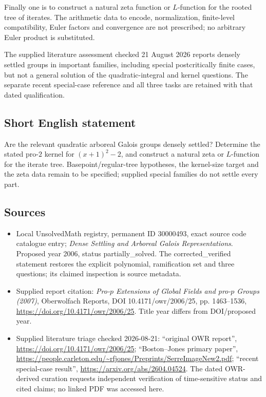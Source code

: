 \documentclass[11pt]{article}
\begin{document}
Finally one is to construct a natural zeta function or $L$-function for the rooted tree of iterates. The arithmetic data to encode, normalization, finite-level compatibility, Euler factors and convergence are not prescribed; no arbitrary Euler product is substituted.

The supplied literature assessment checked 21 August 2026 reports densely settled groups in important families, including special postcritically finite cases, but not a general solution of the quadratic-integral and kernel questions. The separate recent special-case reference and all three tasks are retained with that dated qualification.
\subsection{Short English statement}
Are the relevant quadratic arboreal Galois groups densely settled? Determine the stated pro-$2$ kernel for $(x+1)^2-2$, and construct a natural zeta or $L$-function for the iterate tree. Basepoint/regular-tree hypotheses, the kernel-size target and the zeta data remain to be specified; supplied special families do not settle every part.
\subsection{Sources}
\begin{itemize}
\item Local UnsolvedMath registry, permanent ID 30000493, exact source code catalogue entry; \emph{Dense Settling and Arboreal Galois Representations}. Proposed year 2006, status partially\_solved. The corrected\_verified statement restores the explicit polynomial, ramification set and three questions; its claimed inspection is source metadata.
\item Supplied report citation: \emph{Pro-$p$ Extensions of Global Fields and pro-$p$ Groups (2007)}, Oberwolfach Reports, DOI 10.4171/owr/2006/25, pp. 1463--1536, \url{https://doi.org/10.4171/owr/2006/25}. Title year differs from DOI/proposed year.
\item Supplied literature triage checked 2026-08-21: ``original OWR report'', \url{https://doi.org/10.4171/owr/2006/25}; ``Boston--Jones primary paper'', \url{https://people.carleton.edu/~rfjones/Preprints/SerreImageNew2.pdf}; ``recent special-case result'', \url{https://arxiv.org/abs/2604.04524}. The dated OWR-derived curation requests independent verification of time-sensitive status and cited claims; no linked PDF was accessed here.
\end{itemize}
\end{document}
